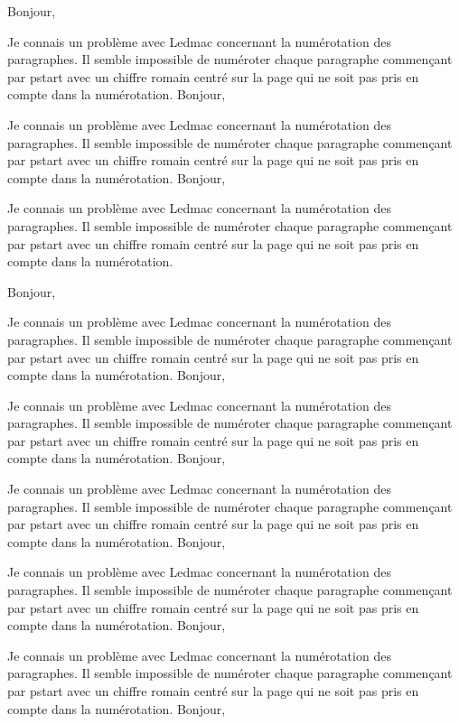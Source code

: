 \documentclass{article}
\begin{document}
\numberpstarttrue
\renewcommand{\thepstart}{\vspace{1cm}{\hfill \Roman{pstart}\hfill} \par\skipnumbering\nopagebreak[4]}


\beginnumbering

\pstart Bonjour,

Je connais un problème avec Ledmac concernant la numérotation des paragraphes. Il semble impossible de numéroter chaque paragraphe commençant par pstart avec un chiffre romain centré sur la page qui ne soit pas pris en compte dans la numérotation.\pend
\pstart Bonjour,

Je connais un problème avec Ledmac concernant la numérotation des paragraphes. Il semble impossible de numéroter chaque paragraphe commençant par pstart avec un chiffre romain centré sur la page qui ne soit pas pris en compte dans la numérotation.\pend
\pstart Bonjour,

Je connais un problème avec Ledmac concernant la numérotation des paragraphes. Il semble impossible de numéroter chaque paragraphe commençant par pstart avec un chiffre romain centré sur la page qui ne soit pas pris en compte dans la numérotation.\pend

\pstart Bonjour,

Je connais un problème avec Ledmac concernant la numérotation des paragraphes. Il semble impossible de numéroter chaque paragraphe commençant par pstart avec un chiffre romain centré sur la page qui ne soit pas pris en compte dans la numérotation.\pend
\pstart Bonjour,

Je connais un problème avec Ledmac concernant la numérotation des paragraphes. Il semble impossible de numéroter chaque paragraphe commençant par pstart avec un chiffre romain centré sur la page qui ne soit pas pris en compte dans la numérotation.\pend
\pstart Bonjour,

Je connais un problème avec Ledmac concernant la numérotation des paragraphes. Il semble impossible de numéroter chaque paragraphe commençant par pstart avec un chiffre romain centré sur la page qui ne soit pas pris en compte dans la numérotation.\pend
\pstart Bonjour,

Je connais un problème avec Ledmac concernant la numérotation des paragraphes. Il semble impossible de numéroter chaque paragraphe commençant par pstart avec un chiffre romain centré sur la page qui ne soit pas pris en compte dans la numérotation.\pend
\pstart Bonjour,

Je connais un problème avec Ledmac concernant la numérotation des paragraphes. Il semble impossible de numéroter chaque paragraphe commençant par pstart avec un chiffre romain centré sur la page qui ne soit pas pris en compte dans la numérotation.\pend
\pstart Bonjour,
\end{document}
